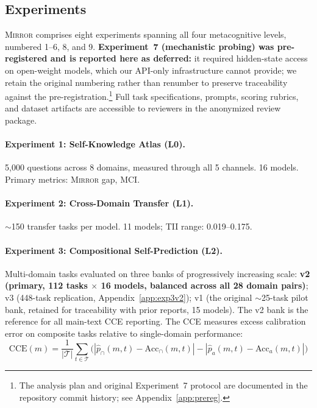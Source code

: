 \documentclass[10pt]{article}
\newcommand{\mirror}{\textsc{Mirror}}
\newcommand{\MCI}{MCI}
\newcommand{\CCE}{CCE}
\newcommand{\TII}{TII}
\begin{document}
\subsection{Experiments}

\mirror{} comprises eight experiments spanning all four metacognitive levels, numbered 1--6, 8, and 9. \textbf{Experiment~7 (mechanistic probing) was pre-registered and is reported here as deferred:} it required hidden-state access on open-weight models, which our API-only infrastructure cannot provide; we retain the original numbering rather than renumber to preserve traceability against the pre-registration.\footnote{The analysis plan and original Experiment~7 protocol are documented in the repository commit history; see Appendix~\ref{app:prereg}.} Full task specifications, prompts, scoring rubrics, and dataset artifacts are accessible to reviewers in the anonymized review package.

\paragraph{Experiment 1: Self-Knowledge Atlas (L0).}
5,000 questions across 8 domains, measured through all 5 channels. 16 models. Primary metrics: \mirror{} gap, \MCI{}.

\paragraph{Experiment 2: Cross-Domain Transfer (L1).}
${\sim}$150 transfer tasks per model. 11 models; \TII{} range: 0.019--0.175.

\paragraph{Experiment 3: Compositional Self-Prediction (L2).}
Multi-domain tasks evaluated on three banks of progressively increasing scale: \textbf{v2 (primary, 112 tasks $\times$ 16 models, balanced across all 28 domain pairs)}; v3 (448-task replication, Appendix~\ref{app:exp3v2}); v1 (the original ${\sim}$25-task pilot bank, retained for traceability with prior reports, 15 models). The v2 bank is the reference for all main-text \CCE{} reporting. The \CCE{} measures excess calibration error on composite tasks relative to single-domain performance:
\begin{equation}
\text{CCE}(m) = \frac{1}{|\mathcal{T}|} \sum_{t \in \mathcal{T}} \bigl(|\hat{p}_{\cap}(m,t) - \text{Acc}_{\cap}(m,t)| - |\hat{p}_{a}(m,t) - \text{Acc}_{a}(m,t)|\bigr)
\label{eq:cce-main}
\end{equation}
\end{document}
